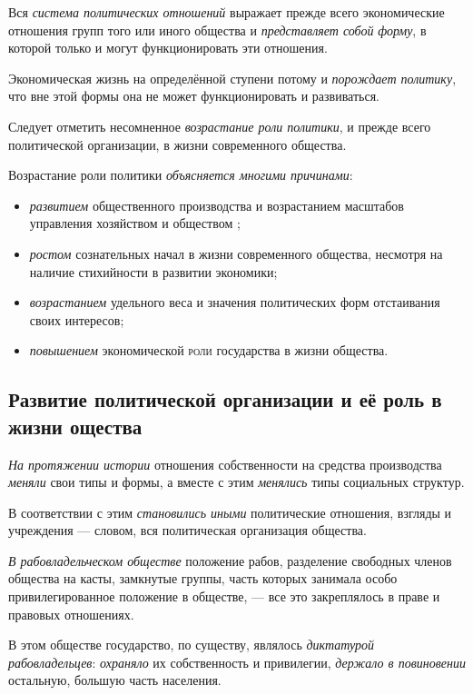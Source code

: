 \documentclass[a4paper,14pt,russian]{extreport}
\begin{document}
Вся \emph{система политических отношений} выражает прежде всего экономические отношения групп того или иного общества и \emph{представляет собой} \emph{форму}, в которой только и могут функционировать эти отношения.

Экономическая жизнь на определённой ступени потому и \emph{порождает политику}, что вне этой формы она не может функционировать и развиваться.

Следует отметить несомненное \emph{возрастание роли политики}, и прежде всего политической организации, в жизни современного общества.

Возрастание роли политики \emph{объясняется многими причинами}:

\begin{itemize}
\item \emph{развитием} общественного производства и возрастанием масштабов управления хозяйством и обществом ;
\item \emph{ростом} сознательных начал в жизни современного общества, несмотря на наличие стихийности в развитии экономики;
\item \emph{возрастанием} удельного веса и значения политических форм отстаивания своих интересов;
\item \emph{повышением} экономической \textsc{роли} государства в жизни общества.
\end{itemize}

\subsection{Развитие политической организации и её роль в жизни ощества}

\emph{На протяжении истории} отношения собственности на средства производства \emph{меняли} свои типы и формы, а вместе с этим \emph{менялись} типы социальных структур.

В соответствии с этим \emph{становились иными} политические отношения, взгляды и учреждения --- словом, вся политическая организация общества.

\emph{В рабовладельческом обществе} положение рабов, разделение свободных членов общества на касты, замкнутые группы, часть которых занимала особо привилегированное положение в обществе, --- все это закреплялось в праве и правовых отношениях.

В этом обществе государство, по существу, являлось \emph{диктатурой рабовладельцев}: \emph{охраняло} их собственность и привилегии, \emph{держало в повиновении} остальную, большую часть населения.
\end{document}
